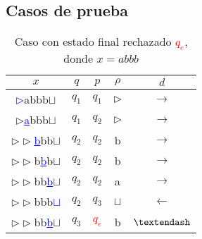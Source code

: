 \documentclass[letterpaper,11pt]{article}
\begin{document}
\subsection{Casos de prueba}

\begin{table}[h!]
\centering
\begin{tabular}{c|c|c|c|c}
\hline
$x$ & $q$ & $p$ & $\rho$ & $d$ \\ \hline
\textcolor{blue}{\underline{$\rhd$}}abbb$\sqcup$  & $q_1$ & $q_1$ & $\rhd$ & $\rightarrow$  \\
$\rhd$\textcolor{blue}{\underline{a}}bbb$\sqcup$  & $q_1$ & $q_2$ & $\rhd$ & $\rightarrow$  \\
$\rhd\rhd$\textcolor{blue}{\underline{b}}bb$\sqcup$  & $q_2$ & $q_2$ & b & $\rightarrow$  \\
$\rhd\rhd$b\textcolor{blue}{\underline{b}}b$\sqcup$  & $q_2$ & $q_2$ & b & $\rightarrow$  \\
$\rhd\rhd$bb\textcolor{blue}{\underline{b}}$\sqcup$  & $q_2$ & $q_2$ & a & $\rightarrow$  \\
$\rhd\rhd$bbb\textcolor{blue}{\underline{$\sqcup$}}  & $q_2$ & $q_3$ & $\sqcup$ & $\leftarrow$  \\
$\rhd\rhd$bb\textcolor{blue}{\underline{b}}$\sqcup$  & $q_3$ & \textcolor{red}{$q_e$} & b & $\textendash$  \\\hline
\end{tabular}
\caption{Caso con estado final rechazado \textcolor{red}{$q_e$}, donde $x=abbb$}
\end{table}
\end{document}
